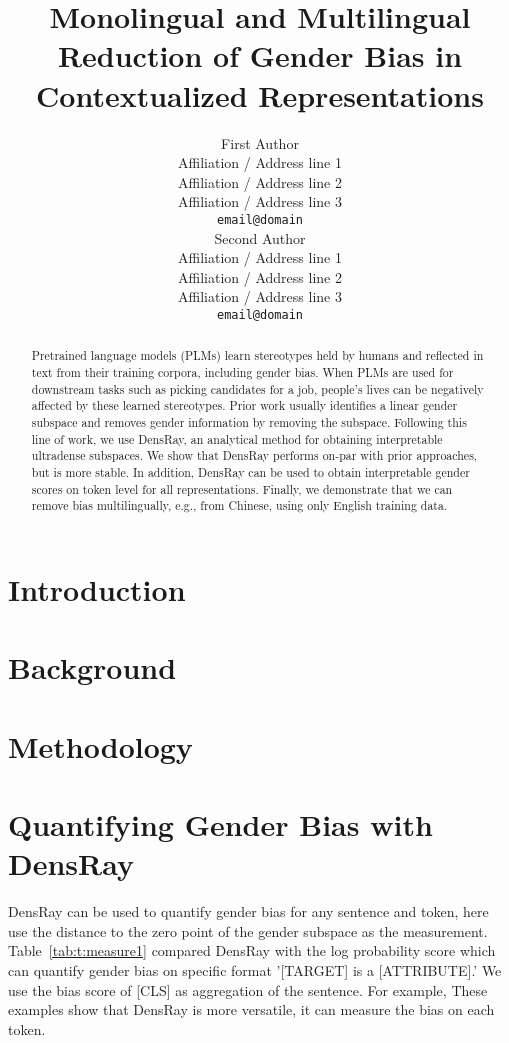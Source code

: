 \documentclass[11pt,a4paper]{article}
\title{Monolingual and Multilingual Reduction of Gender Bias in Contextualized Representations}
\author{First Author \\
  Affiliation / Address line 1 \\
  Affiliation / Address line 2 \\
  Affiliation / Address line 3 \\
  \texttt{email@domain} \\\And
  Second Author \\
  Affiliation / Address line 1 \\
  Affiliation / Address line 2 \\
  Affiliation / Address line 3 \\
  \texttt{email@domain} \\}
\date{}
\def\tabref#1{Table~\ref{tab:#1}}
\begin{document}
\maketitle

\begin{abstract}

Pretrained language models (PLMs) learn 
stereotypes
held by humans and reflected in text
from their training corpora,
including gender bias.  When PLMs are used for downstream
tasks such as picking candidates for a job, people's lives
can be negatively affected by these learned stereotypes.
Prior work usually identifies a linear gender subspace and
removes gender information by removing the
subspace. Following this line of work, we use DensRay, an
analytical method for obtaining interpretable ultradense
subspaces. We show that DensRay performs on-par with prior
approaches, but is more stable. In addition, DensRay can be
used to obtain interpretable gender scores on token level
for all representations.  Finally, we demonstrate that we
can remove bias multilingually, e.g., from Chinese, using
only English training data.

\end{abstract}

\section{Introduction}


\section{Background}


\section{Methodology}


\section{Quantifying Gender Bias with DensRay}
DensRay can be used to quantify gender bias for any sentence and token, here use the distance to the zero point of the gender subspace as the measurement. \tabref{t:measure1} compared DensRay with the log probability score \citep{kurita2019measuring} which can quantify gender bias on specific format '[TARGET] is a [ATTRIBUTE].' We use the bias score of [CLS] as aggregation of the sentence. For example, These examples show that DensRay is more versatile, it can measure the bias on each token.
\end{document}
